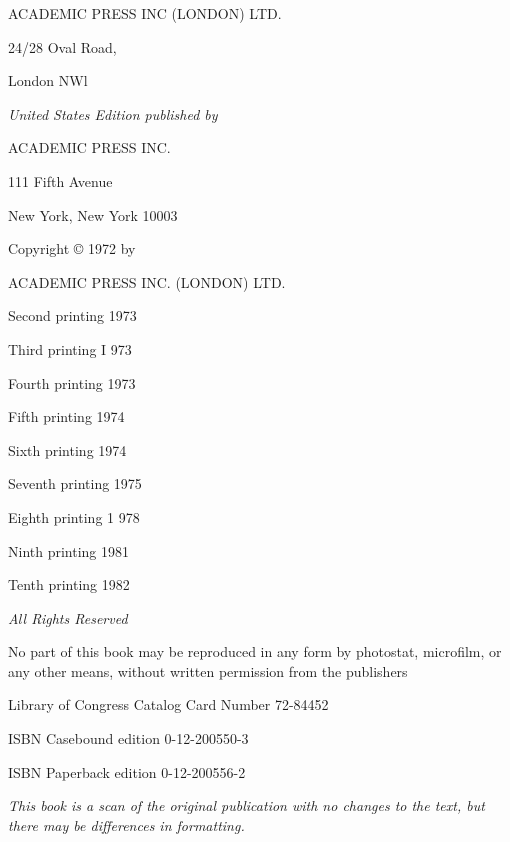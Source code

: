 \begin{center}
	\small
	ACADEMIC PRESS INC (LONDON) LTD.
	
	24/28 Oval Road,
	
	London NWl
	\bigskip
	
	\textit{United States Edition published by}
	
	ACADEMIC PRESS INC.
	
	111 Fifth Avenue
	
	New York, New York 10003
	\vfill
	
	Copyright © 1972 by
	
	ACADEMIC PRESS INC. (LONDON) LTD.
	\vfill
	
	Second printing 1973
	
	Third printing I 973
	
	Fourth printing 1973
	
	Fifth printing 1974
	
	Sixth printing 1974
	
	Seventh printing 1975
	
	Eighth printing 1 978
	
	Ninth printing 1981
	
	Tenth printing 1982
	\vfill
	
	\textit{All Rights Reserved}
		
	No part of this book may be reproduced in any form by photostat, microfilm, or any other means, without written permission from the publishers
	\vfill
	
	Library of Congress Catalog Card Number 72-84452
	
	ISBN Casebound edition 0-12-200550-3
	
	ISBN Paperback edition 0-12-200556-2
	\bigskip
	
	\textit{This book is a scan of the original publication with no changes to the text, but there may be differences in formatting.}

\end{center}